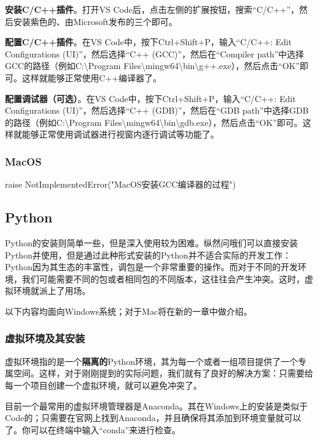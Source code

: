 \documentclass[12pt]{report}
\begin{document}
\textbf{安装C/C++插件}。打开VS Code后，点击左侧的扩展按钮，搜索“C/C++”，然后安装紫色的、由Microsoft发布的三个即可。

\textbf{配置C/C++插件}。在VS Code中，按下Ctrl+Shift+P，输入“C/C++: Edit Configurations (UI)”，然后选择“C++ (GCC)”，然后在“Compiler path”中选择GCC的路径（例如C:\textbackslash Program Files\textbackslash mingw64\textbackslash bin\textbackslash g++.exe），然后点击“OK”即可。这样就能够正常使用C++编译器了。

\textbf{配置调试器（可选）}。在VS Code中，按下Ctrl+Shift+P，输入“C/C++: Edit Configurations (UI)”，然后选择“C++ (GDB)”，然后在“GDB path”中选择GDB的路径（例如C:\textbackslash Program Files\textbackslash mingw64\textbackslash bin\textbackslash gdb.exe），然后点击“OK”即可。这样就能够正常使用调试器进行视窗内逐行调试等功能了。

\subsubsection{MacOS}

\begin{codebox}[title=MacOS安装GCC编译器]   
    raise NotImplementedError("MacOS安装GCC编译器的过程")
\end{codebox}

\subsection{Python}

Python的安装则简单一些，但是深入使用较为困难。纵然问哦们可以直接安装Python并使用，但是通过此种形式安装的Python并不适合实际的开发工作：Python因为其生态的丰富性，调包是一个非常重要的操作。而对于不同的开发环境，我们可能需要不同的包或者相同包的不同版本，这往往会产生冲突。这时，虚拟环境就派上了用场。

以下内容均面向Windows系统；对于Mac将在新的一章中做介绍。

\subsubsection{虚拟环境及其安装}

虚拟环境指的是一个\textbf{隔离的}Python环境，其为每一个或者一组项目提供了一个专属空间。这样，对于刚刚提到的实际问题，我们就有了良好的解决方案：只需要给每一个项目创建一个虚拟环境，就可以避免冲突了。

目前一个最常用的虚拟环境管理器是Anaconda。其在Windows上的安装是类似于Code的；只需要在官网上找到Anaconda，并且确保将其添加到环境变量就可以了。你可以在终端中输入“conda”来进行检查。
\end{document}
